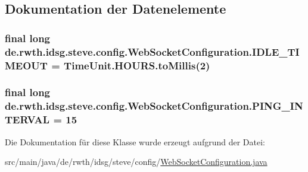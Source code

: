\subsection{Dokumentation der Datenelemente}
\hypertarget{classde_1_1rwth_1_1idsg_1_1steve_1_1config_1_1_web_socket_configuration_a6a950c6ec954540c66dda295b8fb40b9}{
\subsubsection[{I\-D\-L\-E\-\_\-\-T\-I\-M\-E\-O\-U\-T}]{\setlength{\rightskip}{0pt plus 5cm}final long de.\-rwth.\-idsg.\-steve.\-config.\-Web\-Socket\-Configuration.\-I\-D\-L\-E\-\_\-\-T\-I\-M\-E\-O\-U\-T = Time\-Unit.\-H\-O\-U\-R\-S.\-to\-Millis(2)\hspace{0.3cm}{\ttfamily [static]}}}\label{classde_1_1rwth_1_1idsg_1_1steve_1_1config_1_1_web_socket_configuration_a6a950c6ec954540c66dda295b8fb40b9}
\hypertarget{classde_1_1rwth_1_1idsg_1_1steve_1_1config_1_1_web_socket_configuration_aa11b5dc252d4aa2d65e849afe891c1d3}{
\subsubsection[{P\-I\-N\-G\-\_\-\-I\-N\-T\-E\-R\-V\-A\-L}]{\setlength{\rightskip}{0pt plus 5cm}final long de.\-rwth.\-idsg.\-steve.\-config.\-Web\-Socket\-Configuration.\-P\-I\-N\-G\-\_\-\-I\-N\-T\-E\-R\-V\-A\-L = 15\hspace{0.3cm}{\ttfamily [static]}}}\label{classde_1_1rwth_1_1idsg_1_1steve_1_1config_1_1_web_socket_configuration_aa11b5dc252d4aa2d65e849afe891c1d3}


Die Dokumentation für diese Klasse wurde erzeugt aufgrund der Datei\-:\begin{DoxyCompactItemize}
\item 
src/main/java/de/rwth/idsg/steve/config/\hyperlink{_web_socket_configuration_8java}{Web\-Socket\-Configuration.\-java}\end{DoxyCompactItemize}
